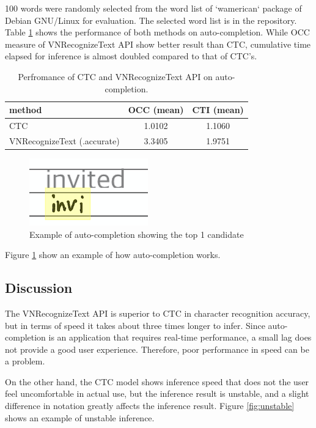 100 words were randomly selected from the word list of `wamerican` package of Debian GNU/Linux for evaluation.
The selected word list is in the repository.
Table \ref{tab:metrics} shows the performance of both methods on auto-completion. While OCC measure of
VNRecognizeText API show better result than CTC, cumulative time elapsed for inference is almost doubled
compared to that of CTC's.

\begin{table}[htbp]
    \centering
    \begin{tabular}{|l||c|c|} \hline
    method & OCC (mean) & CTI (mean) \\ \hline \hline
    CTC & 1.0102 & 1.1060 \\ \hline
    VNRecognizeText (.accurate) & 3.3405 & 1.9751 \\ \hline
    \end{tabular}
    \caption{Perfromance of CTC and VNRecognizeText API on auto-completion.}
    \label{tab:metrics}
\end{table}

\begin{figure}
    \centering
    \includegraphics[]{images/auto-completion.png}
    \caption{Example of auto-completion showing the top 1 candidate}
    \label{fig:auto-complete}
\end{figure}

Figure \ref{fig:auto-complete} show an example of how auto-completion works.

\subsection{Discussion}

The VNRecognizeText API is superior to CTC in character recognition accuracy,
but in terms of speed it takes about three times longer to infer.
Since auto-completion is an application that requires real-time performance,
a small lag does not provide a good user experience. Therefore,
poor performance in speed can be a problem.

On the other hand, the CTC model shows inference speed that does not the user
feel uncomfortable in actual use, but the inference result is unstable,
and a slight difference in notation greatly affects the inference result.
Figure \ref{fig:unstable} shows an example of unstable inference.

